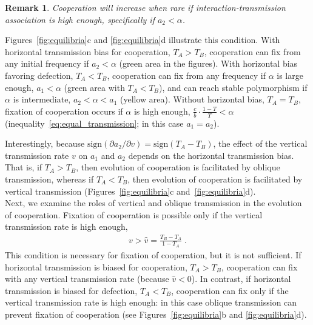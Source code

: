 \documentclass[12pt]{extarticle}
\newtheorem{remark}{Remark}
\begin{document}
\begin{remark}%
\label{remark:intermediate_association_res3}
Cooperation will increase when rare if interaction-transmission association is high enough, specifically if $a_2 < \alpha$.
\end{remark}
Figures~\ref{fig:equilibria}c and \ref{fig:equilibria}d illustrate this condition.
With horizontal transmission bias for cooperation, $T_A>T_B$, cooperation can fix from any initial frequency if $a_2<\alpha$ (green area in the figures). 
With horizontal bias favoring defection, $T_A<T_B$, cooperation can fix from any frequency if $\alpha$ is large enough, $a_1<\alpha$ (green area with $T_A<T_B$), and can reach stable polymorphism if $\alpha$ is intermediate, $a_2<\alpha<a_1$ (yellow area).
Without horizontal bias, $T_A=T_B$, fixation of cooperation occurs if $\alpha$ is high enough, $\frac{c}{b} \cdot \frac{1-T}{T} < \alpha$ (inequality~\ref{eq:equal_transmission}; in this case $a_1=a_2$).

Interestingly, because $\text{sign} (\partial a_2 / \partial v) = \text{sign} (T_A-T_B)$, the effect of the vertical transmission rate $v$ on $a_1$ and $a_2$ depends on the horizontal transmission bias. 
That is, if $T_A>T_B$, then evolution of cooperation is facilitated by oblique transmission, whereas if $T_A<T_B$, then evolution of cooperation is facilitated by vertical transmission (Figures~\ref{fig:equilibria}c and~\ref{fig:equilibria}d).
\\

Next, we examine the roles of vertical and oblique transmission in the evolution of cooperation.
Fixation of cooperation is possible only if the vertical transmission rate is high enough,
  \begin{equation} \label{eq:fixation_of_cooperation_vertical_transmission_condition}
    \begin{aligned}
      v>\hat{v} = \frac{T_B - T_A}{1-T_A} \;.
    \end{aligned}
    \end{equation} 
This condition is necessary for fixation of cooperation, but it is not sufficient.
If horizontal transmission is biased for cooperation, $T_A>T_B$, cooperation can fix with any vertical transmission rate (because $\hat{v}<0$).
In contrast, if horizontal transmission is biased for defection, $T_A<T_B$,  cooperation can fix only if the vertical transmission rate is high enough: in this case oblique transmission can prevent fixation of cooperation (see Figures~\ref{fig:equilibria}b and \ref{fig:equilibria}d).
\end{document}
